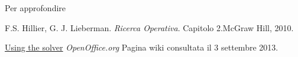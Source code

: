 \documentclass{beamer}
\begin{document}
\begin{frame}{Per approfondire}
\beamertemplatebookbibitems
\begin{thebibliography}{References}
F.S. Hillier, G. J. Lieberman.\newblock
\textit{Ricerca Operativa}. Capitolo 2.\newblock McGraw Hill, 2010.

\href{http://wiki.openoffice.org/wiki/Documentation/OOo3\_User\_Guides/Calc\_Guide/Solver}{Using the solver} \newblock \textit{OpenOffice.org} \newblock Pagina wiki consultata il 3 settembre 2013.



\end{thebibliography}
\end{frame}
\end{document}
